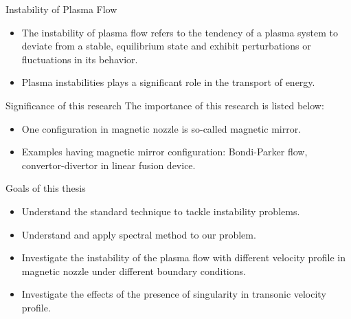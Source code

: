 \begin{frame}{Instability of Plasma Flow}
  \begin{itemize}
    \item The instability of plasma flow refers to the tendency of a plasma system to deviate from a stable, equilibrium state and exhibit perturbations or fluctuations in its behavior.
    \item Plasma instabilities plays a significant role in the transport of energy.
  \end{itemize}  
\end{frame}

\begin{frame}{Significance of this research}
  The importance of this research is listed below:
  \begin{itemize}
    \item One configuration in magnetic nozzle is so-called magnetic mirror.
    \item Examples having magnetic mirror configuration: Bondi-Parker flow, convertor-divertor in linear fusion device. \cite{bondi_spherically_1952,aikawa_stability_1979,keto_stability_2020,smolyakov_quasineutral_2021}
  \end{itemize}
\end{frame}

\begin{frame}{Goals of this thesis}
  \begin{itemize}
    \item Understand the standard technique to tackle instability problems.
    \item Understand and apply spectral method to our problem.
    \item Investigate the instability of the plasma flow with different velocity profile in magnetic nozzle under different boundary conditions.
    \item Investigate the effects of the presence of singularity in transonic velocity profile.
  \end{itemize}  
\end{frame}
